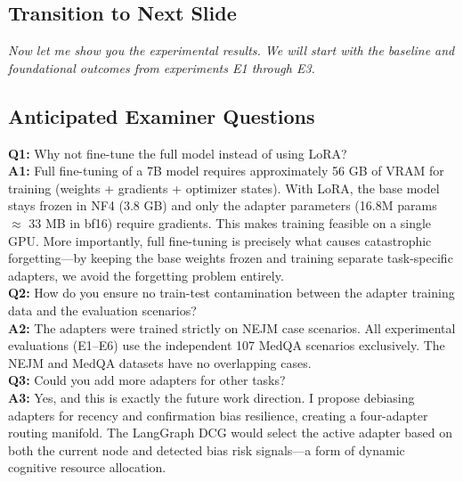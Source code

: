 \subsection*{Transition to Next Slide}
{\color{transgreen}
\textit{Now let me show you the experimental results. We will start with the baseline and foundational outcomes from experiments E1 through E3.}
}

\subsection*{Anticipated Examiner Questions}
\begin{qabox}
\textbf{Q1:} Why not fine-tune the full model instead of using LoRA? \\
\textbf{A1:} Full fine-tuning of a 7B model requires approximately 56 GB of VRAM for training (weights + gradients + optimizer states). With LoRA, the base model stays frozen in NF4 (3.8 GB) and only the adapter parameters (16.8M params $\approx$ 33 MB in bf16) require gradients. This makes training feasible on a single GPU. More importantly, full fine-tuning is precisely what causes catastrophic forgetting---by keeping the base weights frozen and training separate task-specific adapters, we avoid the forgetting problem entirely. \\[6pt]
\textbf{Q2:} How do you ensure no train-test contamination between the adapter training data and the evaluation scenarios? \\
\textbf{A2:} The adapters were trained strictly on NEJM case scenarios. All experimental evaluations (E1--E6) use the independent 107 MedQA scenarios exclusively. The NEJM and MedQA datasets have no overlapping cases. \\[6pt]
\textbf{Q3:} Could you add more adapters for other tasks? \\
\textbf{A3:} Yes, and this is exactly the future work direction. I propose debiasing adapters for recency and confirmation bias resilience, creating a four-adapter routing manifold. The LangGraph DCG would select the active adapter based on both the current node and detected bias risk signals---a form of dynamic cognitive resource allocation.
\end{qabox}

